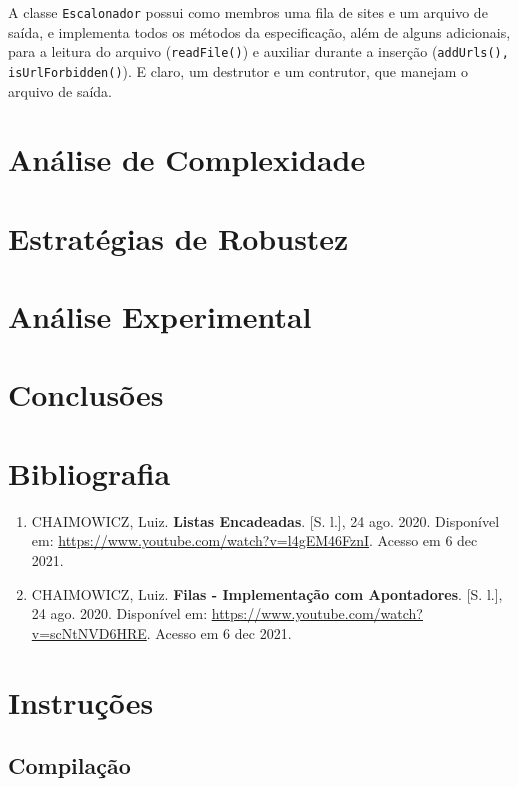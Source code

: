 \documentclass{article}
\def\code#1{\texttt{#1}}
\begin{document}
A classe \code{Escalonador} possui como membros uma fila de sites e um arquivo de saída, e implementa todos os métodos da especificação, além de alguns adicionais, para a leitura do arquivo (\code{readFile()}) e auxiliar durante a inserção (\code{addUrls(), isUrlForbidden()}). E claro, um destrutor e um contrutor, que manejam o arquivo de saída.

\section{Análise de Complexidade}

\section{Estratégias de Robustez}



\section{Análise Experimental}

\section{Conclusões}

\section{Bibliografia}

\begin{enumerate}

    \item CHAIMOWICZ, Luiz. \textbf{Listas Encadeadas}. [S. l.], 24 ago. 2020. Disponível em: \url{https://www.youtube.com/watch?v=l4gEM46FznI}. Acesso em 6 dec 2021.

    \item CHAIMOWICZ, Luiz. \textbf{Filas - Implementação com Apontadores}. [S. l.], 24 ago. 2020. Disponível em: \url{https://www.youtube.com/watch?v=scNtNVD6HRE}. Acesso em 6 dec 2021.
        
\end{enumerate}


\newpage
\section*{Instruções}

\subsection*{Compilação}
\end{document}
